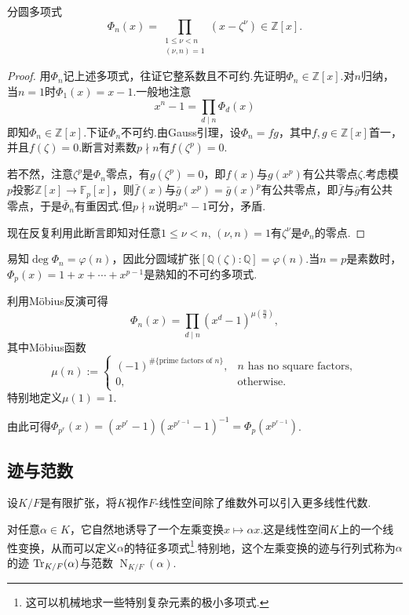 \begin{prop}
    分圆多项式
    \[
        \displaystyle\Phi_n(x)=\prod_{\substack{1\le\nu<n\\(\nu,n)=1}}(x-\zeta^\nu)\in\mathbb{Z}[x].
    \]\vspace*{-10pt}
\end{prop}
\begin{proof}
    用$\Phi_n$记上述多项式，往证它整系数且不可约.先证明$\Phi_n\in\mathbb{Z}[x]$.对$n$归纳，当$n=1$时$\Phi_1(x)=x-1$.一般地注意
    \[
        x^n-1=\prod_{d\mid n}\Phi_d(x)
    \]
    即知$\Phi_n\in\mathbb{Z}[x]$.下证$\Phi_n$不可约.由Gauss引理，设$\Phi_n=fg$，其中$f,g\in\mathbb{Z}[x]$首一，并且$f(\zeta)=0$.断言对素数$p\nmid n$有$f(\zeta^p)=0$.

    若不然，注意$\zeta^p$是$\Phi_n$零点，有$g(\zeta^p)=0$，即$f(x)$与$g(x^p)$有公共零点$\zeta$.考虑模$p$投影$\mathbb{Z}[x]\to\mathbb{F}_p[x]$，则$\bar f(x)$与$\bar g(x^p)=\bar g(x)^p$有公共零点，即$\bar f$与$\bar g$有公共零点，于是$\bar\Phi_n$有重因式.但$p\nmid n$说明$x^n-1$可分，矛盾.

    现在反复利用此断言即知对任意$1\le\nu<n,\,(\nu,n)=1$有$\zeta^\nu$是$\Phi_n$的零点.
\end{proof}

易知$\deg\Phi_n=\varphi(n)$，因此分圆域扩张$[\mathbb{Q}(\zeta):\mathbb{Q}]=\varphi(n)$.当$n=p$是素数时，$\Phi_p(x)=1+x+\cdots+x^{p-1}$是熟知的不可约多项式.
\begin{remark}
    利用M\"obius反演可得
    \[
        \Phi_n(x)=\prod_{d\mid n}(x^d-1)^{\mu(\frac{n}{d})},
    \]
    其中M\"obius函数
    \[
        \mu(n):=\begin{cases}
            (-1)^{\#\{\text{prime factors of }n\}},&n\text{ has no square factors},\\
            0,&\text{otherwise}.
            \end{cases}
    \]
    特别地定义$\mu(1)=1$.

    由此可得$\Phi_{p^r}(x)=(x^{p^r}-1)(x^{p^{r-1}}-1)^{-1}=\Phi_p(x^{p^{r-1}})$.
\end{remark}

\subsection{迹与范数}
设$K/F$是有限扩张，将$K$视作$F$-线性空间除了维数外可以引入更多线性代数.

对任意$\alpha\in K$，它自然地诱导了一个左乘变换$x\mapsto\alpha x$.这是线性空间$K$上的一个线性变换，从而可以定义$\alpha$的特征多项式\footnote{这可以机械地求一些特别复杂元素的极小多项式.}.特别地，这个左乘变换的迹与行列式称为$\alpha$的{\heiti 迹} $\operatorname{Tr}_{K/F}(\alpha)$与{\heiti 范数} $\operatorname*{N}_{K/F}(\alpha)$.

